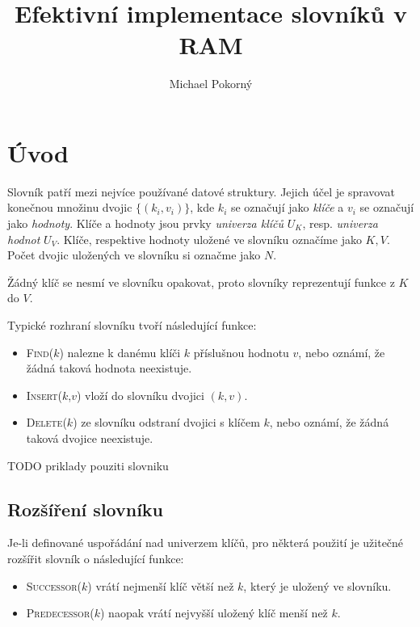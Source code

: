 \documentclass[a4paper]{article}
\begin{document}
\title{Efektivní implementace slovníků v RAM}
\author{Michael Pokorný}

\def\O{\mathcal{O}}
\def\Cpp{C++}

\maketitle
\tableofcontents

\section{Úvod}
Slovník patří mezi nejvíce používané datové struktury.
Jejich účel je spravovat konečnou množinu dvojic $\{(k_i,v_i)\}$,
kde $k_i$ se označují jako \textit{klíče} a $v_i$ se označují
jako \textit{hodnoty}. Klíče a hodnoty jsou prvky \textit{univerza
klíčů} $U_K$, resp. \textit{univerza hodnot} $U_V$. Klíče, respektive
hodnoty uložené ve slovníku označíme jako $K, V$. Počet dvojic uložených
ve slovníku si označme jako $N$.

Žádný klíč se nesmí ve slovníku opakovat, proto slovníky reprezentují
funkce z $K$ do $V$.

Typické rozhraní slovníku tvoří následující funkce:
\begin{itemize}
\item \textsc{Find($k$)}
	nalezne k danému klíči $k$ příslušnou hodnotu $v$, nebo oznámí,
	že žádná taková hodnota neexistuje.

\item \textsc{Insert($k$,$v$)}
	vloží do slovníku dvojici $(k,v)$.

\item \textsc{Delete($k$)}
	ze slovníku odstraní dvojici s klíčem $k$, nebo oznámí,
	že žádná taková dvojice neexistuje.
\end{itemize}

TODO priklady pouziti slovniku

\subsection{Rozšíření slovníku}
Je-li definované uspořádání nad univerzem klíčů, pro některá použití
je užitečné rozšířit slovník o následující funkce:
\begin{itemize}
\item \textsc{Successor($k$)}
	vrátí nejmenší klíč větší než $k$, který je uložený ve slovníku.
\item \textsc{Predecessor($k$)}
	naopak vrátí nejvyšší uložený klíč menší než $k$.
\end{itemize}
\end{document}
